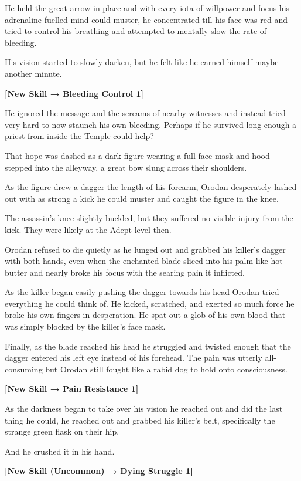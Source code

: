 \documentclass[a4paper,10pt]{book}
\begin{document}
He held the great arrow in place and with every iota of willpower and focus his adrenaline-fuelled mind could muster, he concentrated till his face was red and tried to control his breathing and attempted to mentally slow the rate of bleeding.\par
His vision started to slowly darken, but he felt like he earned himself maybe another minute.\par
\textbf{[New Skill → Bleeding Control 1]}\par
He ignored the message and the screams of nearby witnesses and instead tried very hard to now staunch his own bleeding. Perhaps if he survived long enough a priest from inside the Temple could help?\par
That hope was dashed as a dark figure wearing a full face mask and hood stepped into the alleyway, a great bow slung across their shoulders.\par
As the figure drew a dagger the length of his forearm, Orodan desperately lashed out with as strong a kick he could muster and caught the figure in the knee.\par
The assassin’s knee slightly buckled, but they suffered no visible injury from the kick. They were likely at the Adept level then.\par
Orodan refused to die quietly as he lunged out and grabbed his killer’s dagger with both hands, even when the enchanted blade sliced into his palm like hot butter and nearly broke his focus with the searing pain it inflicted.\par
As the killer began easily pushing the dagger towards his head Orodan tried everything he could think of. He kicked, scratched, and exerted so much force he broke his own fingers in desperation. He spat out a glob of his own blood that was simply blocked by the killer’s face mask.\par
Finally, as the blade reached his head he struggled and twisted enough that the dagger entered his left eye instead of his forehead. The pain was utterly all-consuming but Orodan still fought like a rabid dog to hold onto consciousness.\par
\textbf{[New Skill → Pain Resistance 1]}\par
As the darkness began to take over his vision he reached out and did the last thing he could, he reached out and grabbed his killer’s belt, specifically the strange green flask on their hip.\par
And he crushed it in his hand.\par
\textbf{[New Skill (Uncommon) → Dying Struggle 1]}\par
\end{document}
